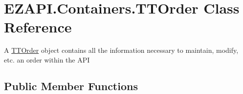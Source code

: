 \hypertarget{class_e_z_a_p_i_1_1_containers_1_1_t_t_order}{\section{E\-Z\-A\-P\-I.\-Containers.\-T\-T\-Order Class Reference}
\label{class_e_z_a_p_i_1_1_containers_1_1_t_t_order}
}


A \hyperlink{class_e_z_a_p_i_1_1_containers_1_1_t_t_order}{T\-T\-Order} object contains all the information necessary to maintain, modify, etc. an order within the A\-P\-I  


\subsection*{Public Member Functions}
